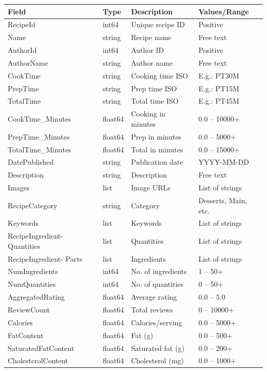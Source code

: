 \documentclass[11pt,a4paper]{article}
\begin{document}
\begin{table}[H]
\centering
\footnotesize
\begin{tabular}{llp{4cm}p{3cm}}
\toprule
\textbf{Field} & \textbf{Type} & \textbf{Description} & \textbf{Values/Range} \\
\midrule
RecipeId & int64 & Unique recipe ID & Positive \\
Name & string & Recipe name & Free text \\
AuthorId & int64 & Author ID & Positive \\
AuthorName & string & Author name & Free text \\
CookTime & string & Cooking time ISO & E.g.: PT30M \\
PrepTime & string & Prep time ISO & E.g.: PT15M \\
TotalTime & string & Total time ISO & E.g.: PT45M \\
CookTime\_Minutes & float64 & Cooking in minutes & 0.0 -- 10000+ \\
PrepTime\_Minutes & float64 & Prep in minutes & 0.0 -- 5000+ \\
TotalTime\_Minutes & float64 & Total in minutes & 0.0 -- 15000+ \\
DatePublished & string & Publication date & YYYY-MM-DD \\
Description & string & Description & Free text \\
Images & list & Image URLs & List of strings \\
RecipeCategory & string & Category & Desserts, Main, etc. \\
Keywords & list & Keywords & List of strings \\
RecipeIngredient- Quantities & list & Quantities & List of strings \\
RecipeIngredient- Parts & list & Ingredients & List of strings \\
NumIngredients & int64 & No. of ingredients & 1 -- 50+ \\
NumQuantities & int64 & No. of quantities & 0 -- 50+ \\
AggregatedRating & float64 & Average rating & 0.0 -- 5.0 \\
ReviewCount & float64 & Total reviews & 0 -- 10000+ \\
Calories & float64 & Calories/serving & 0.0 -- 5000+ \\
FatContent & float64 & Fat (g) & 0.0 -- 500+ \\
SaturatedFatContent & float64 & Saturated fat (g) & 0.0 -- 200+ \\
CholesterolContent & float64 & Cholesterol (mg) & 0.0 -- 1000+ \\

\end{tabular}
\end{table}
\end{document}
